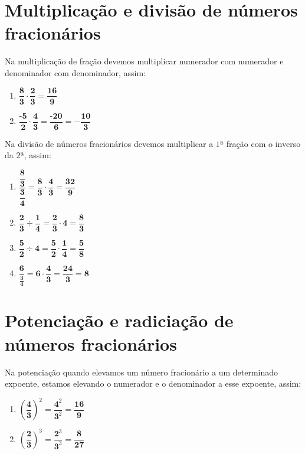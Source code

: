 \section{Multiplicação e divisão de números fracionários}

Na multiplicação de fração devemos multiplicar numerador com numerador e denominador com denominador, assim:
\begin{enumerate}[label=\alph*)]
	\item $\dfrac{\textbf{8}}{\textbf{3}} \cdot \dfrac{\textbf{2}}{\textbf{3}} = \dfrac{\textbf{16}}{\textbf{9}}$
	\item $\dfrac{\textbf{-5}}{\textbf{2}} \cdot \dfrac{\textbf{4}}{\textbf{3}} = \dfrac{\textbf{-20}}{\textbf{6}} = - \dfrac{\textbf{10}}{\textbf{3}}$ \\ 
\end{enumerate}

\noindent Na divisão de números fracionários devemos multiplicar a $1ª$ fração com o inverso da $2ª$, assim:
\begin{enumerate}[label=\alph*)]
	\item $\dfrac{\dfrac{\textbf{8}}{\textbf{3}}}{\dfrac{\textbf{3}}{\textbf{4}}} = \dfrac{\textbf{8}}{\textbf{3}} \cdot \dfrac{\textbf{4}}{\textbf{3}} = \dfrac{\textbf{32}}{\textbf{9}}$
	
	\item $\dfrac{\textbf{2}}{\textbf{3}} \div \dfrac{\textbf{1}}{\textbf{4}} = \dfrac{\textbf{2}}{\textbf{3}} \cdot \textbf{4} = \dfrac{\textbf{8}}{\textbf{3}}$
	
	\item $\dfrac{\textbf{5}}{\textbf{2}} \div \textbf{4} = \dfrac{\textbf{5}}{\textbf{2}} \cdot \dfrac{\textbf{1}}{\textbf{4}} = \dfrac{\textbf{5}}{\textbf{8}}$
	
	\item $\dfrac{\textbf{6}}{\frac{\textbf{3}}{\textbf{4}}} = \textbf{6} \cdot \dfrac{\textbf{4}}{\textbf{3}} = \dfrac{\textbf{24}}{\textbf{3}} = \textbf{8}$
\end{enumerate}

\section{Potenciação e radiciação de números fracionários}

Na potenciação quando elevamos um número fracionário a um determinado expoente, estamos elevando o numerador e o denominador a esse expoente, assim:
\begin{enumerate}[label=\alph*)]
	\item $\left(\dfrac{\textbf{4}}{\textbf{3}}\right)^{2} = \dfrac{\textbf{4}^{2}}{\textbf{3}^{2}} = \dfrac{\textbf{16}}{\textbf{9}}$
	\item $\left(\dfrac{\textbf{2}}{\textbf{3}}\right)^{3} = \dfrac{\textbf{2}^{3}}{\textbf{3}^{3}} = \dfrac{\textbf{8}}{\textbf{27}}$ \\ 
\end{enumerate}


